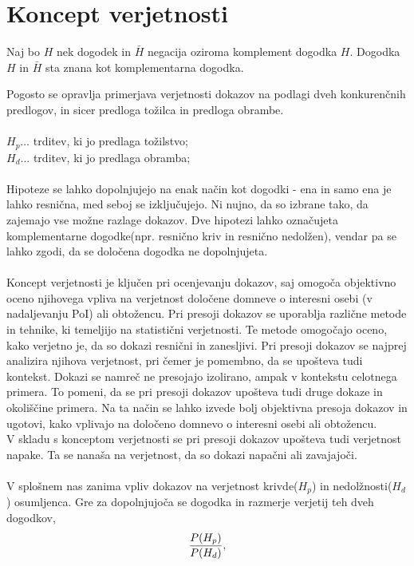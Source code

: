\documentclass[fin1, tisk]{fmfdelo}
\theoremstyle{definition}
\theoremstyle{trditev}
\theoremstyle{izrek}
\begin{document}
\section{Koncept verjetnosti}
\begin{definicija}
    Naj bo $H$ nek dogodek in $\bar{H}$ negacija oziroma komplement dogodka $H$. Dogodka $H$ in $\bar{H}$ sta znana kot komplementarna dogodka.
\end{definicija}
Pogosto se opravlja primerjava verjetnosti dokazov na podlagi dveh konkurenčnih predlogov, in sicer predloga tožilca in predloga obrambe.\\\\
$H_p \dots$ trditev, ki jo predlaga tožilstvo;\\
$H_d \dots$ trditev, ki jo predlaga obramba;\\\\
Hipoteze se lahko dopolnjujejo na enak način kot dogodki - ena in samo ena je lahko resnična, med seboj se izključujejo. Ni nujno, da so izbrane 
tako, da zajemajo vse možne razlage dokazov. Dve hipotezi lahko označujeta komplementarne dogodke(npr. resnično kriv in resnično nedolžen), 
vendar pa se lahko zgodi, da se določena dogodka ne dopolnjujeta. \\\\
Koncept verjetnosti je ključen pri ocenjevanju dokazov, saj omogoča objektivno oceno njihovega vpliva na verjetnost določene domneve o interesni 
osebi (v nadaljevanju PoI) ali obtožencu. Pri presoji dokazov se uporablja različne metode in tehnike, ki temeljijo na statistični verjetnosti. 
Te metode omogočajo oceno, kako verjetno je, da so dokazi resnični in zanesljivi. Pri presoji dokazov se najprej analizira njihova verjetnost, pri 
čemer je pomembno, da se upošteva tudi kontekst. Dokazi se namreč ne presojajo izolirano, ampak v kontekstu celotnega primera. To pomeni, da se 
pri presoji dokazov upošteva tudi druge dokaze in okoliščine primera. Na ta način se lahko izvede bolj objektivna presoja dokazov in ugotovi, kako 
vplivajo na določeno domnevo o interesni osebi ali obtožencu.\\
V skladu s konceptom verjetnosti se pri presoji dokazov upošteva tudi verjetnost napake. Ta se nanaša na verjetnost, da so dokazi napačni ali 
zavajajoči. \\\\
V splošnem nas zanima vpliv dokazov na verjetnost krivde($H_p$) in nedolžnosti($H_d$) osumljenca. Gre za dopolnjujoča se dogodka in razmerje verjetij 
teh dveh dogodkov,
\begin{equation}
   \frac{P(H_p)}{P(H_d)}, \vspace{2mm}
\end{equation}
\end{document}
